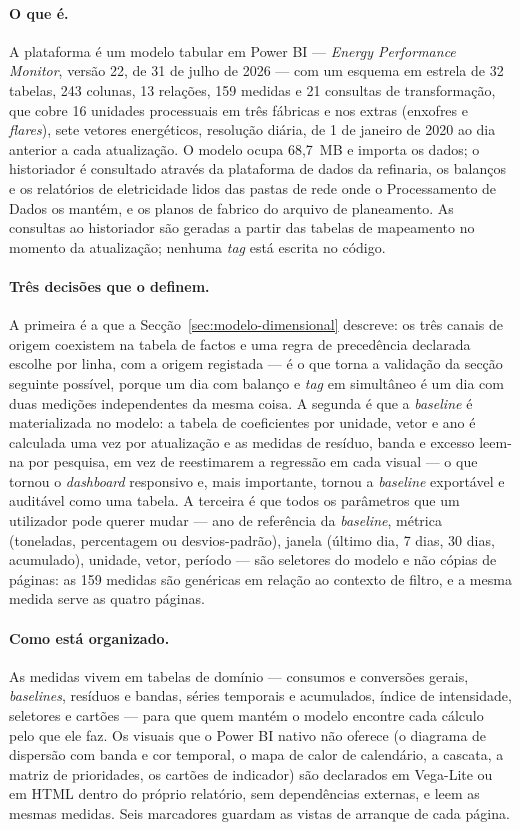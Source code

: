 \paragraph{O que é.} A plataforma é um modelo tabular em Power BI ---
\emph{Energy Performance Monitor}, versão 22, de 31 de julho de 2026 ---
com um esquema em estrela de 32 tabelas, 243 colunas, 13 relações, 159
medidas e 21 consultas de transformação, que cobre 16 unidades processuais
em três fábricas e nos extras (enxofres e \emph{flares}), sete vetores
energéticos, resolução diária, de 1 de janeiro de 2020 ao dia anterior a
cada atualização. O modelo ocupa 68,7~MB e importa os dados; o historiador
é consultado através da plataforma de dados da refinaria, os balanços e os
relatórios de eletricidade lidos das pastas de rede onde o Processamento de
Dados os mantém, e os planos de fabrico do arquivo de planeamento. As
consultas ao historiador são geradas a partir das tabelas de mapeamento
no momento da atualização; nenhuma \emph{tag} está escrita no código.

\paragraph{Três decisões que o definem.} A primeira é a que a
Secção~\ref{sec:modelo-dimensional} descreve: os três canais de origem
coexistem na tabela de factos e uma regra de precedência declarada escolhe
por linha, com a origem registada --- é o que torna a validação da secção
seguinte possível, porque um dia com balanço e \emph{tag} em simultâneo é
um dia com duas medições independentes da mesma coisa. A segunda é que a
\emph{baseline} é materializada no modelo: a tabela de coeficientes por
unidade, vetor e ano é calculada uma vez por atualização e as medidas de
resíduo, banda e excesso leem-na por pesquisa, em vez de reestimarem a
regressão em cada visual --- o que tornou o \emph{dashboard} responsivo e,
mais importante, tornou a \emph{baseline} exportável e auditável como uma
tabela. A terceira é que todos os parâmetros que um utilizador pode querer
mudar --- ano de referência da \emph{baseline}, métrica (toneladas,
percentagem ou desvios-padrão), janela (último dia, 7 dias, 30 dias,
acumulado), unidade, vetor, período --- são seletores do modelo e não
cópias de páginas: as 159 medidas são genéricas em relação ao contexto de
filtro, e a mesma medida serve as quatro páginas.

\paragraph{Como está organizado.} As medidas vivem em tabelas de domínio
--- consumos e conversões gerais, \emph{baselines}, resíduos e bandas,
séries temporais e acumulados, índice de intensidade, seletores e cartões
--- para que quem mantém o modelo encontre cada cálculo pelo que ele faz.
Os visuais que o Power BI nativo não oferece (o diagrama de dispersão com
banda e cor temporal, o mapa de calor de calendário, a cascata, a matriz
de prioridades, os cartões de indicador) são declarados em Vega-Lite ou em
HTML dentro do próprio relatório, sem dependências externas, e leem as
mesmas medidas. Seis marcadores guardam as vistas de arranque de cada
página.

